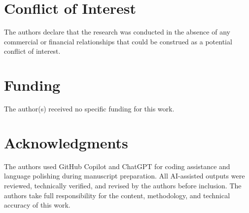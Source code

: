 \documentclass[utf8]{FrontiersinHarvard}
\begin{document}
\section*{Conflict of Interest}
The authors declare that the research was conducted in the absence of any commercial or financial relationships that could be construed as a potential conflict of interest.

\section*{Funding}
The author(s) received no specific funding for this work.

\section*{Acknowledgments}
The authors used GitHub Copilot and ChatGPT for coding assistance and language polishing during manuscript preparation. All AI-assisted outputs were reviewed, technically verified, and revised by the authors before inclusion. The authors take full responsibility for the content, methodology, and technical accuracy of this work.



\end{document}
